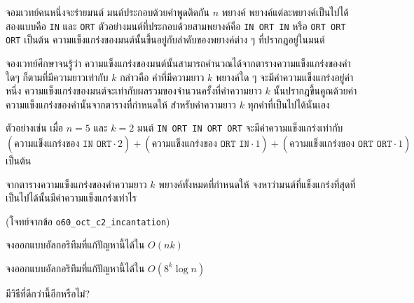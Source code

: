 จอมเวทย์คนหนึ่งจะร่ายมนต์ มนต์ประกอบด้วยคำพูดติดกัน $n$ พยางค์ พยางค์แต่ละพยางค์เป็นไปได้สองแบบคือ \texttt{IN} และ \texttt{ORT} ตัวอย่างมนต์ที่ประกอบด้วยสามพยางค์คือ \texttt{IN ORT IN} หรือ \texttt{ORT ORT ORT} เป็นต้น ความแข็งแกร่งของมนต์นั้นขึ้นอยู่กับลำดับของพยางค์ต่าง ๆ ที่ปรากฎอยู่ในมนต์

จองเวทย์ศึกษาจนรู้ว่า ความแข็งแกร่งของมนต์นั้นสามารถคำนวณได้จากตารางความแข็งแกร่งของคำใดๆ ก็ตามที่มีความยาวเท่ากับ $k$ กล่าวคือ คำที่มีความยาว $k$ พยางค์ใด ๆ จะมีค่าความแข็งแกร่งอยู่ค่าหนึ่ง ความแข็งแกร่งของมนต์จะเท่ากับผลรวมของจำนวนครั้งที่คำความยาว $k$ นั้นปรากฎขึ้นคูณด้วยค่าความแข็งแกร่งของคำนั้นจากตารางที่กำหนดให้ สำหรับคำความยาว $k$ ทุกคำที่เป็นไปได้นั่นเอง

ตัวอย่างเช่น เมื่อ $n = 5$ และ $k = 2$ มนต์ \texttt{IN ORT IN ORT ORT} จะมีค่าความแข็งแกร่งเท่ากับ $(\text{ความแข็งแกร่งของ } \texttt{IN ORT} \cdot 2) + (\text{ความแข็งแกร่งของ } \texttt{ORT IN} \cdot 1) + (\text{ความแข็งแกร่งของ } \texttt{ORT ORT} \cdot 1)$ เป็นต้น

จากตารางความแข็งแกร่งของคำความยาว $k$ พยางค์ทั้งหมดที่กำหนดให้ จงหาว่ามนต์ที่แข็งแกร่งที่สุดที่เป็นไปได้นั้นมีค่าความแข็งแกร่งเท่าไร

(โจทย์จากข้อ \texttt{o60\_oct\_c2\_incantation})

\begin{exercise}
จงออกแบบอัลกอริทึมที่แก้ปัญหานี้ได้ใน $O(nk)$
\end{exercise}

\begin{exercise}
จงออกแบบอัลกอริทึมที่แก้ปัญหานี้ได้ใน $O(8^k \log n)$
\end{exercise}

\begin{bonus}
มีวิธีที่ดีกว่านี้อีกหรือไม่?
\end{bonus}